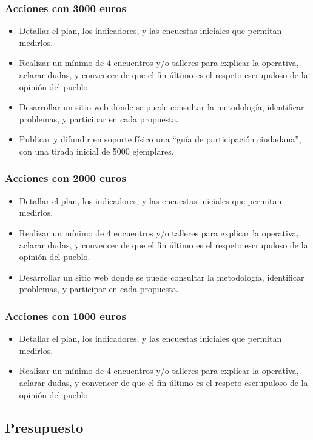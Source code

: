 \documentclass[11pt]{article}
\begin{document}
\subsubsection{Acciones con 3000 euros}
\label{sec-2-5-1}
\begin{itemize}
\item Detallar el plan, los indicadores, y las encuestas iniciales que permitan medirlos.
\item Realizar un mínimo de 4 encuentros y/o talleres para explicar la o\-pe\-ra\-ti\-va, aclarar dudas, y convencer de que el fin último es el respeto escrupuloso de la opinión del pueblo.
\item Desarrollar un sitio web donde se puede consultar la metodología, identificar problemas, y participar en cada propuesta.
\item Publicar y difundir en soporte físico una ``guía de participación ciudadana'', con una tirada inicial de 5000 ejemplares.
\end{itemize}
\subsubsection{Acciones con 2000 euros}
\label{sec-2-5-2}
\begin{itemize}
\item Detallar el plan, los indicadores, y las encuestas iniciales que permitan medirlos.
\item Realizar un mínimo de 4 encuentros y/o talleres para explicar la o\-pe\-ra\-ti\-va, aclarar dudas, y convencer de que el fin último es el respeto escrupuloso de la opinión del pueblo.
\item Desarrollar un sitio web donde se puede consultar la metodología, identificar problemas, y participar en cada propuesta.
\end{itemize}
\subsubsection{Acciones con 1000 euros}
\label{sec-2-5-3}
\begin{itemize}
\item Detallar el plan, los indicadores, y las encuestas iniciales que permitan medirlos.
\item Realizar un mínimo de 4 encuentros y/o talleres para explicar la o\-pe\-ra\-ti\-va, aclarar dudas, y convencer de que el fin último es el respeto escrupuloso de la opinión del pueblo.
\end{itemize}
\subsection{Presupuesto}
\label{sec-2-6}
\end{document}
